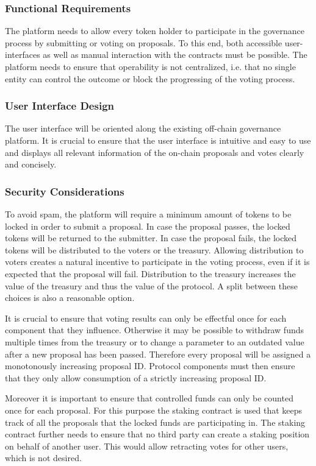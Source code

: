 \documentclass[11pt]{article}
\begin{document}
\subsubsection{Functional Requirements}

The platform needs to allow every token holder to participate in the governance process by submitting or voting on proposals.
To this end, both accessible user-interfaces as well as manual interaction with the contracts must be possible.
The platform needs to ensure that operability is not centralized, i.e. that no single entity can control the outcome or block the progressing of the voting process.

\subsubsection{User Interface Design}
The user interface will be oriented along the existing off-chain governance platform.
It is crucial to ensure that the user interface is intuitive and easy to use and displays all relevant information
of the on-chain proposals and votes clearly and concisely.

\subsubsection{Security Considerations}

To avoid spam, the platform will require a minimum amount of tokens to be locked in order to submit a proposal.
In case the proposal passes, the locked tokens will be returned to the submitter.
In case the proposal fails, the locked tokens will be distributed to the voters or the treasury.
Allowing distribution to voters creates a natural incentive to participate in the voting process, even if it is expected that the proposal will fail.
Distribution to the treasury increases the value of the treasury and thus the value of the protocol.
A split between these choices is also a reasonable option.

It is crucial to ensure that voting results can only be effectful once for each component that they influence.
Otherwise it may be possible to withdraw funds multiple times from the treasury or to change a parameter to an outdated value after a new proposal has been passed.
Therefore every proposal will be assigned a monotonously increasing proposal ID.
Protocol components must then ensure that they only allow consumption of a strictly increasing proposal ID.

Moreover it is important to ensure that controlled funds can only be counted once for each proposal.
For this purpose the staking contract is used that keeps track of all the proposals that the locked funds are participating in.
The staking contract further needs to ensure that no third party can create a staking position on behalf of another user.
This would allow retracting votes for other users, which is not desired.
\end{document}
